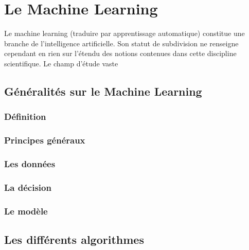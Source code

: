 \chapter{ Le  Machine Learning}
\label{Le Machine Learning}
\thispagestyle{fancy}
Le machine learning (traduire par apprentissage automatique) constitue une branche de l'intelligence artificielle. Son statut de subdivision ne renseigne cependant en rien sur l'étendu des notions contenues dans cette discipline scientifique. Le champ d'étude vaste 

\section{Généralités sur le Machine Learning}
\label{Le Machine Learning: Généralités sur le Machine Learning}

\subsection{Définition}
\label{Le Machine Learning: Les différents algorithmes: Définition}

\subsection{Principes généraux}
\label{Le Machine Learning: Les différents algorithmes: Principes généraux}

\subsection{Les données}
\label{Le Machine Learning: Les différents algorithmes: Les données}

\subsection{La décision}
\label{Le Machine Learning: Les différents algorithmes: La décision}

\subsection{Le modèle}
\label{Le Machine Learning: Les différents algorithmes: Le modèle}


\section{Les différents algorithmes}
\label{ILe Machine Learning: Les différents algorithmes}

